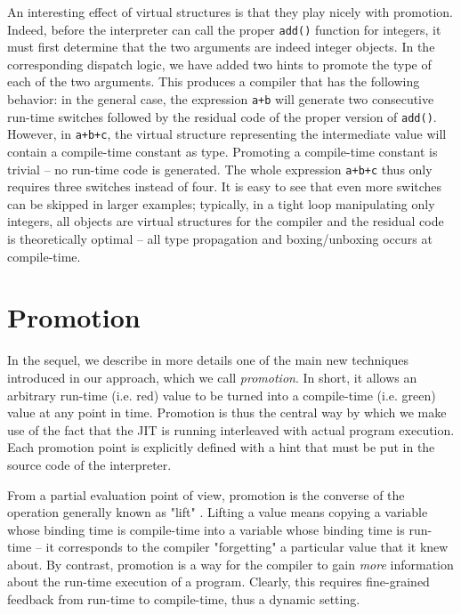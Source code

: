 An interesting effect of virtual structures is that they play nicely with
promotion.  Indeed, before the interpreter can call the proper \texttt{add()}
function for integers, it must first determine that the two arguments
are indeed integer objects.  In the corresponding dispatch logic, we
have added two hints to promote the type of each of the two arguments.
This produces a compiler that has the following behavior: in the general
case, the expression \texttt{a+b} will generate two consecutive run-time
switches followed by the residual code of the proper version of
\texttt{add()}.  However, in \texttt{a+b+c}, the virtual structure representing
the intermediate value will contain a compile-time constant as type.
Promoting a compile-time constant is trivial – no run-time code is
generated.  The whole expression \texttt{a+b+c} thus only requires three
switches instead of four.  It is easy to see that even more switches can
be skipped in larger examples; typically, in a tight loop manipulating
only integers, all objects are virtual structures for the compiler and
the residual code is theoretically optimal – all type propagation and
boxing/unboxing occurs at compile-time.


\section{Promotion}
\label{sec:promotion}

In the sequel, we describe in more details one of the main new
techniques introduced in our approach, which we call \emph{promotion}.  In
short, it allows an arbitrary run-time (i.e. red) value to be turned into a
compile-time (i.e. green) value at any point in time.  Promotion is thus the central way by
which we make use of the fact that the JIT is running interleaved with actual
program execution. Each promotion point is explicitly defined with a hint that
must be put in the source code of the interpreter.

From a partial evaluation point of view, promotion is the converse of
the operation generally known as "lift" \cite{XXX}.  Lifting a value means
copying a variable whose binding time is compile-time into a variable
whose binding time is run-time – it corresponds to the compiler
"forgetting" a particular value that it knew about.  By contrast,
promotion is a way for the compiler to gain \emph{more} information about
the run-time execution of a program. Clearly, this requires
fine-grained feedback from run-time to compile-time, thus a
dynamic setting.


